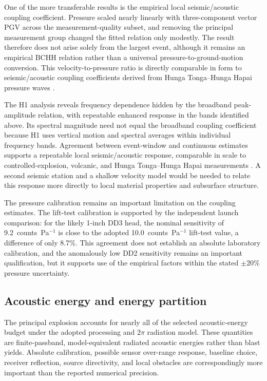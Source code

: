\documentclass[]{seismica}
\begin{document}
One of the more transferable results is the empirical local
seismic/acoustic coupling coefficient. Pressure scaled nearly linearly with
three-component vector PGV across the measurement-quality subset, and removing
the principal measurement group changed the fitted relation only modestly. The
result therefore does not arise solely from the largest event, although it
remains an empirical BCHH relation rather than a universal
pressure-to-ground-motion conversion. This velocity-to-pressure ratio is
directly comparable in form to seismic/acoustic coupling coefficients derived
from Hunga Tonga--Hunga Ha\textquotesingle pai pressure waves
\citep{anthony_hunga_coupling_2023,macpherson_hunga_coupling_2025}.

The H1 analysis reveals frequency dependence hidden by the broadband
peak-amplitude relation, with repeatable enhanced response in the bands
identified above. Its spectral magnitude need not equal the broadband coupling
coefficient because H1 uses vertical motion and spectral averages within
individual frequency bands. Agreement between event-window and continuous
estimates supports a repeatable local seismic/acoustic response, comparable in
scale to controlled-explosion, volcanic, and Hunga Tonga--Hunga Ha\textquotesingle pai
measurements \citep{novoselov_ground_coupling_2020,anthony_hunga_coupling_2023,
macpherson_hunga_coupling_2025}. A second seismic station and a shallow
velocity model would be needed to relate this response more directly to local
material properties and subsurface structure.

The pressure calibration remains an important limitation on the coupling
estimates. The lift-test calibration is supported by the independent launch
comparison: for the likely 1-inch DD3 head, the nominal sensitivity of
9.2~counts~Pa$^{-1}$ is close to the adopted 10.0~counts~Pa$^{-1}$ lift-test
value, a difference of only 8.7\%. This agreement does not establish an
absolute laboratory calibration, and the anomalously low DD2 sensitivity
remains an important qualification, but it supports use of the empirical
factors within the stated $\pm20\%$ pressure uncertainty.

\subsection{Acoustic energy and energy partition}

The principal explosion accounts for nearly all of the selected
acoustic-energy budget under the adopted processing and $2\pi$ radiation
model. These quantities are finite-passband, model-equivalent radiated acoustic
energies rather than blast yields. Absolute calibration, possible sensor
over-range response, baseline choice, receiver reflection, source directivity,
and local obstacles are correspondingly more important than the reported
numerical precision.
\end{document}
